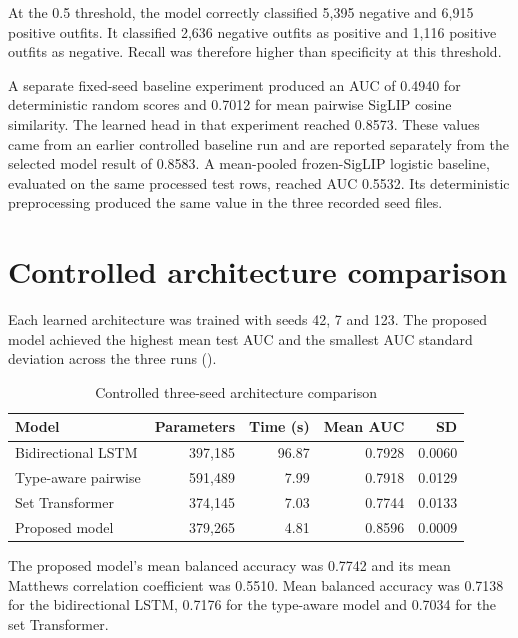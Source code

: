 At the 0.5 threshold, the model correctly classified 5,395 negative and 6,915
positive outfits. It classified 2,636 negative outfits as positive and 1,116
positive outfits as negative. Recall was therefore higher than specificity at
this threshold.

A separate fixed-seed baseline experiment produced an AUC of 0.4940 for
deterministic random scores and 0.7012 for mean pairwise SigLIP cosine
similarity. The learned head in that experiment reached 0.8573. These values
came from an earlier controlled baseline run and are reported separately from
the selected model result of 0.8583. A mean-pooled frozen-SigLIP logistic
baseline, evaluated on the same processed test rows, reached AUC 0.5532. Its
deterministic preprocessing produced the same value in the three recorded seed
files.

\section{Controlled architecture comparison}

Each learned architecture was trained with seeds 42, 7 and 123. The proposed
model achieved the highest mean test AUC and the smallest AUC standard deviation
across the three runs ().

\begin{table}[htbp]
  \centering
  \caption{Controlled three-seed architecture comparison}
  \label{tab:architecture-results}
  \begin{tabularx}{\textwidth}{>{\raggedright\arraybackslash}Xrrrr}
    \toprule
    Model & Parameters & Time (s) & Mean AUC & SD \\
    \midrule
    Bidirectional LSTM & 397,185 & 96.87 & 0.7928 & 0.0060 \\
    Type-aware pairwise & 591,489 & 7.99 & 0.7918 & 0.0129 \\
    Set Transformer & 374,145 & 7.03 & 0.7744 & 0.0133 \\
    Proposed model & 379,265 & 4.81 & 0.8596 & 0.0009 \\
    \bottomrule
  \end{tabularx}
\end{table}

The proposed model's mean balanced accuracy was 0.7742 and its mean Matthews
correlation coefficient was 0.5510. Mean balanced accuracy was 0.7138 for the
bidirectional LSTM, 0.7176 for the type-aware model and 0.7034 for the set
Transformer.

